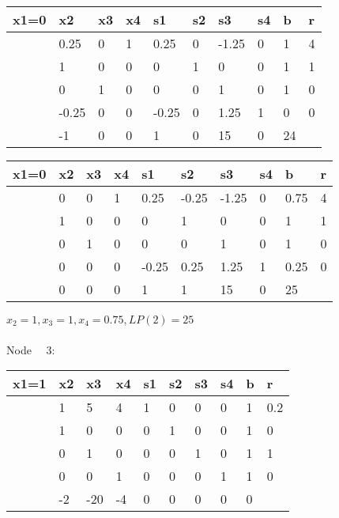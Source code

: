 \documentclass{article} %
\numberwithin{equation}{section} %
\numberwithin{figure}{section} %
\numberwithin{table}{section} %
\begin{document}
\begin{center}
\begin{tabular}{|l|l|l|l|l|l|l|l|l|l|}
\hline
x1=0 & x2    & x3 & x4 & s1    & s2 & s3    & s4 & b  & r \\ \hline
     & 0.25  & 0  & 1  & 0.25  & 0  & -1.25 & 0  & 1  & 4 \\ \hline
     & 1     & 0  & 0  & 0     & 1  & 0     & 0  & 1  & 1 \\ \hline
     & 0     & 1  & 0  & 0     & 0  & 1     & 0  & 1  & 0 \\ \hline
     & -0.25 & 0  & 0  & -0.25 & 0  & 1.25  & 1  & 0  & 0 \\ \hline
     & -1    & 0  & 0  & 1     & 0  & 15    & 0  & 24 &   \\ \hline
\end{tabular}
\end{center}
\begin{center}
\begin{tabular}{|l|l|l|l|l|l|l|l|l|l|}
\hline
x1=0 & x2 & x3 & x4 & s1    & s2    & s3    & s4 & b    & r \\ \hline
     & 0  & 0  & 1  & 0.25  & -0.25 & -1.25 & 0  & 0.75 & 4 \\ \hline
     & 1  & 0  & 0  & 0     & 1     & 0     & 0  & 1    & 1 \\ \hline
     & 0  & 1  & 0  & 0     & 0     & 1     & 0  & 1    & 0 \\ \hline
     & 0  & 0  & 0  & -0.25 & 0.25  & 1.25  & 1  & 0.25 & 0 \\ \hline
     & 0  & 0  & 0  & 1     & 1     & 15    & 0  & 25   &   \\ \hline
\end{tabular}
\end{center}
$x_2=1,x_3=1,x_4=0.75,LP(2)=25$
\\
\\
Node \ \ 3:
\begin{center}
\begin{tabular}{|l|l|l|l|l|l|l|l|l|l|}
\hline
x1=1 & x2 & x3  & x4 & s1 & s2 & s3 & s4 & b & r   \\ \hline
     & 1  & 5   & 4  & 1  & 0  & 0  & 0  & 1 & 0.2 \\ \hline
     & 1  & 0   & 0  & 0  & 1  & 0  & 0  & 1 & 0   \\ \hline
     & 0  & 1   & 0  & 0  & 0  & 1  & 0  & 1 & 1   \\ \hline
     & 0  & 0   & 1  & 0  & 0  & 0  & 1  & 1 & 0   \\ \hline
     & -2 & -20 & -4 & 0  & 0  & 0  & 0  & 0 &     \\ \hline
\end{tabular}
\end{center}
\end{document}
